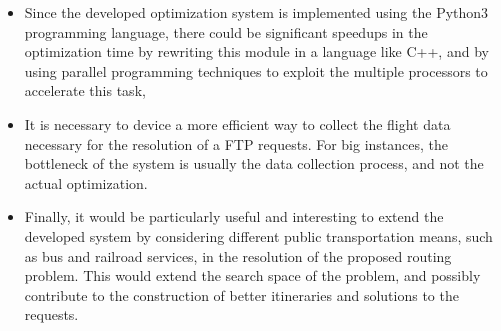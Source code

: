 \begin{itemize}
    \item Since the developed optimization system is implemented using the Python3 programming language, there could be significant speedups in the optimization time by rewriting this module in a language like C++, and by using parallel programming techniques to exploit the multiple processors to accelerate this task,
    
    \item It is necessary to device a more efficient way to collect the flight data necessary for the resolution of a FTP requests. For big instances, the bottleneck of the system is usually the data collection process, and not the actual optimization.
    
    \item Finally, it would be particularly useful and interesting to extend the developed system by considering different public transportation means, such as bus and railroad services, in the resolution of the proposed routing problem. This would extend the search space of the problem, and possibly contribute to the construction of better itineraries and solutions to the requests.
    
    
\end{itemize}


































